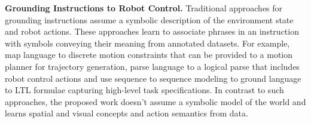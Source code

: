 \textbf{Grounding Instructions to Robot Control.} Traditional approaches for grounding instructions assume a symbolic description of the environment state 
and robot actions. 
%
These approaches learn to associate phrases in an instruction with symbols conveying their meaning from 
annotated datasets. 
%
For example, \cite{howard2014natural,paul2016efficient,tellex2011approaching} map language to discrete motion constraints that can be provided to a motion planner for trajectory generation, \cite{matuszek2013learning,knepper2013ikeabot} parse language to a logical parse that includes  robot control actions and \cite{gopalan2018sequence,williams2018learning} use sequence to sequence modeling to ground language to LTL formulae capturing high-level task specifications. 
%
%
In contrast to such approaches, the proposed work doesn't assume a symbolic model of the world and learns spatial and visual concepts and action semantics from data. 

